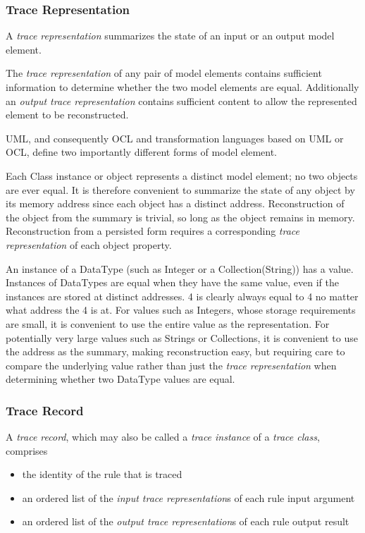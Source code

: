 \documentclass[runningheads,a4paper]{llncs}
\begin{document}
\subsubsection{Trace Representation}

A \emph{trace representation} summarizes the state of an input or an output model element.

The \emph{trace representation} of any pair of model elements contains sufficient information to determine whether the two model elements are equal. Additionally an \emph{output trace representation} contains sufficient content to allow the represented element to be reconstructed.

UML, and consequently OCL and transformation languages based on UML or OCL, define two importantly different forms of model element.

Each Class instance or object represents a distinct model element; no two objects are ever equal. It is therefore convenient to summarize the state of any object by its memory address since each object has a distinct address. Reconstruction of the object from the summary is trivial, so long as the object remains in memory. Reconstruction from  a persisted form requires a corresponding \emph{trace representation} of each object property.

An instance of a DataType (such as Integer or a Collection(String)) has a value. Instances of DataTypes are equal when they have the same value, even if the instances are stored at distinct addresses. 4 is clearly always equal to 4 no matter what address the 4 is at. 
For values such as Integers, whose storage requirements are small, it is convenient to use the entire value as the representation. For potentially very large values such as Strings or Collections, it is convenient to use the address as the summary, making reconstruction easy, but requiring care to compare the underlying value rather than just the \emph{trace representation} when determining whether two DataType values are equal.

\subsubsection{Trace Record}

A \emph{trace record}, which may also be called a \emph{trace instance} of a \emph{trace class}, comprises
\begin{itemize}
\item the identity of the rule that is traced
\item an ordered list of the \emph{input trace representation}s of each rule input argument
\item an ordered list of the \emph{output trace representation}s of each rule output result
\end{itemize}
\end{document}
